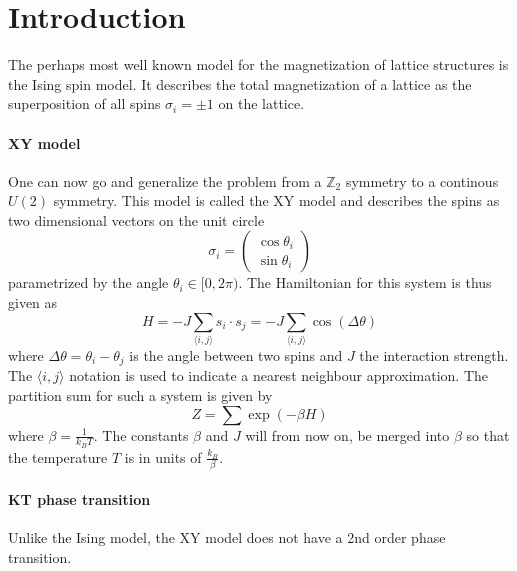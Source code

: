 \section{Introduction}
The perhaps most well known model for the magnetization of lattice structures is the Ising spin model. It describes the total magnetization of a lattice as the superposition of all spins $\sigma_i = \pm 1$ on the lattice.

\paragraph{XY model}
One can now go and generalize the problem from a $\mathbb{Z}_2$ symmetry to a continous $U(2)$ symmetry. This model is called the XY model and describes the spins as two dimensional vectors on the unit circle
\begin{equation}\label{eq:hamiltonian}
	\sigma_i = \begin{pmatrix}
		\cos{\theta_i} \\ \sin{\theta_i}
	\end{pmatrix}
\end{equation}
parametrized by the angle $\theta_i \in [0,2\pi)$. The Hamiltonian for this system is thus given as
\begin{equation}\label{eq:partition}
	H = -J \sum_{\langle i,j \rangle}{s_i \cdot s_j} = -J \sum_{\langle i,j \rangle}{\cos{(\Delta \theta)}}
\end{equation}
where $\Delta \theta = \theta_i - \theta_j$ is the angle between two spins and $J$ the interaction strength. The $\langle i,j \rangle$ notation is used to indicate a nearest neighbour approximation. The partition sum for such a system is given by
\begin{equation}
	Z = \sum{\exp{(-\beta H)}}
\end{equation}
where $\beta = \frac{1}{k_B T}$.  The constants $\beta$ and $J$ will from now on, be merged into $\beta$ so that the temperature $T$ is in units of $\frac{k_B}{\beta}$.

\paragraph{KT phase transition}
Unlike the Ising model, the XY model does not have a 2nd order phase transition.
